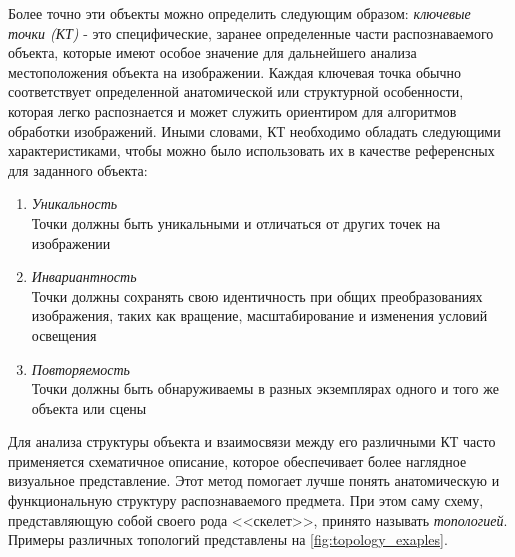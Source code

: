 Более точно эти объекты можно определить следующим образом: \textit{ключевые точки (КТ)} - это специфические, заранее определенные части распознаваемого объекта, которые имеют особое значение для дальнейшего анализа местоположения объекта на изображении. Каждая ключевая точка обычно соответствует определенной анатомической или структурной особенности, которая легко распознается и может служить ориентиром для алгоритмов обработки изображений. Иными словами, КТ необходимо обладать следующими характеристиками, чтобы можно было использовать их в качестве референсных для заданного объекта:
\begin{enumerate}
\item \textit{Уникальность}\\
Точки должны быть уникальными и отличаться от других точек на изображении
\item \textit{Инвариантность} \\
Точки должны сохранять свою идентичность при общих преобразованиях изображения, таких как вращение, масштабирование и изменения условий освещения 
\item \textit{Повторяемость} \\
Точки должны быть обнаруживаемы в разных экземплярах одного и того же объекта или сцены
\end{enumerate}

Для анализа структуры объекта и взаимосвязи между его различными КТ часто применяется схематичное описание, которое обеспечивает более наглядное визуальное представление. Этот метод помогает лучше понять анатомическую и функциональную структуру распознаваемого предмета. При этом саму схему, представляющую собой своего рода <<скелет>>, принято называть \textit{топологией}. Примеры различных топологий представлены на \autoref{fig:topology_exaples}.

